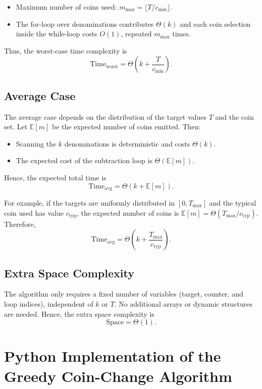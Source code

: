 \documentclass[12pt,a4paper]{report}
\begin{document}
\begin{itemize}
    \item Maximum number of coins used: \(m_{\max} = \lfloor T / c_{\min} \rfloor\).
    \item The for-loop over denominations contributes \(\Theta(k)\) and each coin selection inside the while-loop costs \(O(1)\), repeated \(m_{\max}\) times.
\end{itemize}

Thus, the worst-case time complexity is
\[
\text{Time}_{\text{worst}} = \Theta\!\left(k + \frac{T}{c_{\min}}\right).
\]

\subsection{Average Case}
The average case depends on the distribution of the target values \(T\) and the coin set. Let \(\mathbb{E}[m]\) be the expected number of coins emitted. Then:

\begin{itemize}
    \item Scanning the \(k\) denominations is deterministic and costs \(\Theta(k)\).
    \item The expected cost of the subtraction loop is \(\Theta(\mathbb{E}[m])\).
\end{itemize}

Hence, the expected total time is
\[
\text{Time}_{\text{avg}} = \Theta\!\left(k + \mathbb{E}[m]\right).
\]

For example, if the targets are uniformly distributed in \([0,T_{\max}]\) and the typical coin used has value \(c_{\mathrm{typ}}\), the expected number of coins is 
\(\mathbb{E}[m] = \Theta(T_{\max} / c_{\mathrm{typ}})\). Therefore,
\[
\text{Time}_{\text{avg}} = \Theta\!\left(k + \frac{T_{\max}}{c_{\mathrm{typ}}}\right).
\]

\subsection{Extra Space Complexity}
The algorithm only requires a fixed number of variables (target, counter, and loop indices), 
independent of \(k\) or \(T\). No additional arrays or dynamic structures are needed. 
Hence, the extra space complexity is
\[
\text{Space} = \Theta(1).
\]


\section{Python Implementation of the Greedy Coin-Change Algorithm}
\end{document}

